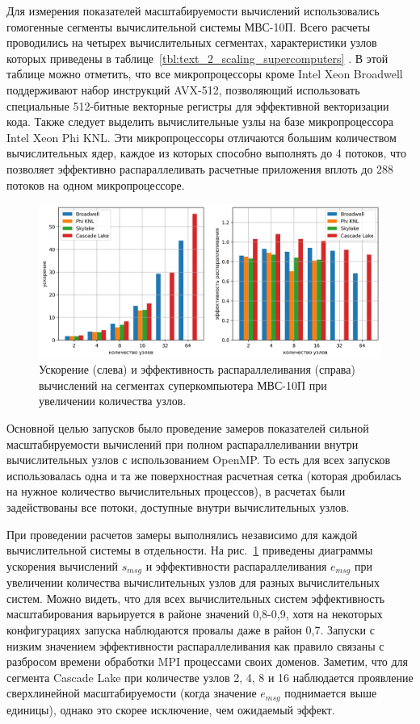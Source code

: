 Для измерения показателей масштабируемости вычислений использовались гомогенные сегменты вычислительной системы МВС-10П.
Всего расчеты проводились на четырех вычислительных сегментах, характеристики узлов которых приведены в таблице~\ref{tbl:text_2_scaling_supercomputers} \cite{Shabanov2021Scaling}.
В этой таблице можно отметить, что все микропроцессоры кроме Intel Xeon Broadwell поддерживают набор инструкций AVX-512, позволяющий использовать специальные 512-битные векторные регистры для эффективной векторизации кода.
Также следует выделить вычислительные узлы на базе микропроцессора Intel Xeon Phi KNL.
Эти микропроцессоры отличаются большим количеством вычислительных ядер, каждое из которых способно выполнять до 4 потоков, что позволяет эффективно распараллеливать расчетные приложения вплоть до 288 потоков на одном микропроцессоре.

\begin{figure}[ht]
\centering
\includegraphics[width=1.0\textwidth]{fig/par_surf_2in1.png}
\singlespacing
{}\caption{Ускорение (слева) и эффективность распараллеливания (справа) вычислений на сегментах суперкомпьютера МВС-10П при увеличении количества узлов.}
\label{fig:text_2_scaling_speedup_eff}
\end{figure}

Основной целью запусков было проведение замеров показателей сильной масштабируемости вычислений при полном распараллеливании внутри вычислительных узлов с использованием OpenMP.
То есть для всех запусков использовалась одна и та же поверхностная расчетная сетка (которая дробилась на нужное количество вычислительных процессов), в расчетах были задействованы все потоки, доступные внутри вычислительных узлов.

При проведении расчетов замеры выполнялись независимо для каждой вычислительной системы в отдельности.
На рис.~\ref{fig:text_2_scaling_speedup_eff} приведены диаграммы ускорения вычислений $s_{msg}$ и эффективности распараллеливания $e_{msg}$ при увеличении количества вычислительных узлов для разных вычислительных систем.
Можно видеть, что для всех вычислительных систем эффективность масштабирования варьируется в районе значений 0,8-0,9, хотя на некоторых конфигурациях запуска наблюдаются провалы даже в район 0,7.
Запуски с низким значением эффективности распараллеливания как правило связаны с разбросом времени обработки MPI\label{abbr:mpi-6} процессами своих доменов.
Заметим, что для сегмента Cascade Lake при количестве узлов 2, 4, 8 и 16 наблюдается проявление сверхлинейной масштабируемости (когда значение $e_{msg}$ поднимается выше единицы), однако это скорее исключение, чем ожидаемый эффект.

